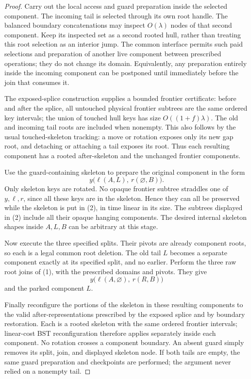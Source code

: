 \documentclass[11pt]{article}
\begin{document}
\begin{proof}
Carry out the local access and guard preparation inside the selected
component. The incoming tail is selected through its own root handle.
The balanced boundary concatenations may inspect $O(\lambda)$ nodes
of that second component. Keep its inspected set as a second rooted
hull, rather than treating this root selection as an interior jump.
The common interface permits such paid selections and preparation of
another live component between prescribed operations; they do not
change its domain. Equivalently, any preparation entirely inside the
incoming component can be postponed until immediately before the join
that consumes it.

The exposed-splice construction supplies a bounded frontier certificate:
before and after the splice, all untouched physical frontier subtrees
are the same ordered key intervals; the union of touched hull keys
has size $O((1+f)\lambda)$. The old and incoming tail roots are included
when nonempty. This also follows by the usual touched-skeleton tracking:
a move or rotation exposes only its new gap root, and detaching or
attaching a tail exposes its root. Thus each resulting component has
a rooted after-skeleton and the unchanged frontier components.

Use the guard-containing skeleton to prepare the original component
in the form
\[
 y\bigl(\ell(A,L),\ r(\varnothing,B)\bigr).
                                                        \tag{2}
\]
Only skeleton keys are rotated. No opaque frontier subtree straddles
one of $y,\ell,r$, since all these keys are in the skeleton. Hence
they can all be preserved while the skeleton is put in (2), in time
linear in its size. The subtrees displayed in (2) include all their
opaque hanging components. The desired internal skeleton shapes
inside $A,L,B$ can be arbitrary at this stage.

Now execute the three specified splits. Their pivots are already
component roots, so each is a legal common root deletion. The old
tail $L$ becomes a separate component exactly at its specified split,
and no earlier. Perform the three raw root joins of (1), with the
prescribed domains and pivots. They give
\[
 y\bigl(\ell(A,\varnothing),\ r(R,B)\bigr)
                                                        \tag{3}
\]
and the parked component $L$.

Finally reconfigure the portions of the skeleton in these resulting
components to the valid after-representations prescribed by the
exposed splice and by boundary restoration. Each is a rooted skeleton
with the same ordered frontier intervals; linear-cost BST reconfiguration
therefore applies separately inside each component. No rotation crosses
a component boundary. An absent guard simply removes its split, join,
and displayed skeleton node. If both tails are empty, the same
guard preparation and checkpoints are performed; the argument never
relied on a nonempty tail.


\end{proof}
\end{document}
